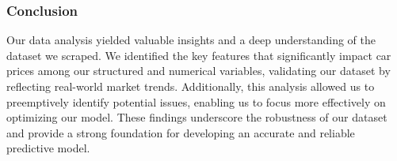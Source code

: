 \subsubsection{Conclusion}
Our data analysis yielded valuable insights and a deep understanding of the dataset we scraped. We identified the key features that significantly impact car prices among our structured and numerical variables, validating our dataset by reflecting real-world market trends. Additionally, this analysis allowed us to preemptively identify potential issues, enabling us to focus more effectively on optimizing our model. These findings underscore the robustness of our dataset and provide a strong foundation for developing an accurate and reliable predictive model.
